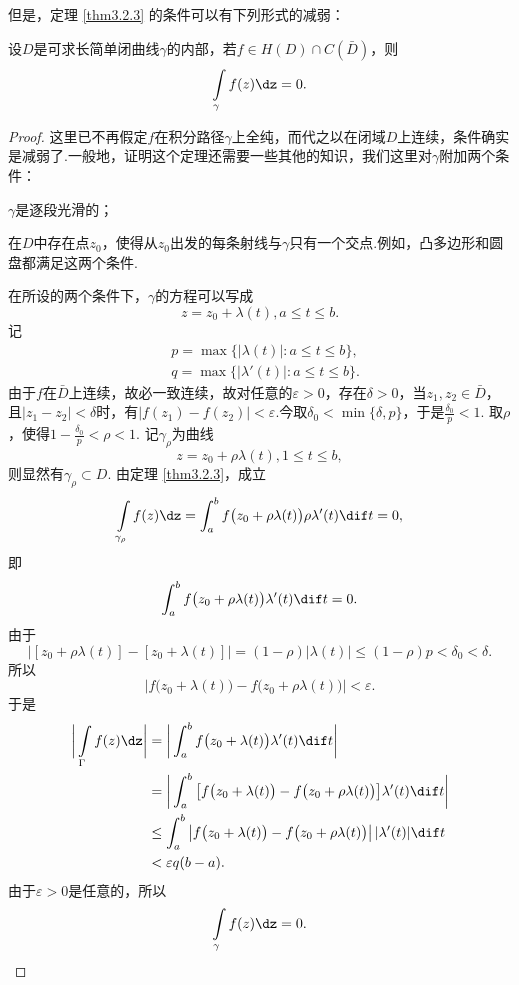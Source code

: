 但是，定理 \ref{thm3.2.3} 的条件可以有下列形式的减弱：
\begin{theorem}\label{thm3.2.4}
设$D$是可求长简单闭曲线$\gamma$的内部，若$f\in H(D)\cap C(\bar D)$，则
\[\int\limits_\gamma f(z)\dz=0.\]
\end{theorem}
\begin{proof}
这里已不再假定$f$在积分路径$\gamma$上全纯，而代之以在闭域$D$上连续，条件确实是减弱了.一般地，证明这个定理还需要一些其他的知识，我们这里对$\gamma$附加两个条件：
\begin{eenum}
\item $\gamma$是逐段光滑的；
\item 在$D$中存在点$z_0$，使得从$z_0$出发的每条射线与$\gamma$只有一个交点.例如，凸多边形和圆盘都满足这两个条件.
\end{eenum}

在所设的两个条件下，$\gamma$的方程可以写成
\[z=z_0+\lambda(t),a\le t\le b.\]
记
\begin{align*}
&p=\max\{|\lambda(t)|:a\le t\le b\},\\
&q=\max\{|\lambda'(t)|:a\le t\le b\}.
\end{align*}
由于$f$在$\bar D$上连续，故必一致连续，故对任意的$\varepsilon>0$，存在$\delta>0$，当$z_1,z_2\in\bar D$，且$|z_1-z_2|<\delta$时，有$|f(z_1)-f(z_2)|<\varepsilon$.今取$\delta_0<\min\{\delta,p\}$，于是$\frac{\delta_0}p<1$. 取$\rho$，使得$1-\frac{\delta_0}p<\rho<1$. 记$\gamma_\rho$为曲线
\[z=z_0+\rho\lambda(t),1\le t\le b,\]
则显然有$\gamma_\rho\subset D$. 由定理 \ref{thm3.2.3}，成立
\[\int\limits_{\gamma_\rho}f(z)\dz=\int_a^bf\big(z_0+\rho\lambda(t)\big)
\rho\lambda'(t)\dif t=0,\]
即
\[\int_a^bf\big(z_0+\rho\lambda(t)\big)\lambda'(t)\dif t=0.\]
由于
\[\big|[z_0+\rho\lambda(t)]-[z_0+\lambda(t)]\big|
  = (1-\rho)|\lambda(t)|\le(1-\rho)p<\delta_0<\delta.\]
所以
\[\big|f\big(z_0+\lambda(t)\big)-f\big(z_0+\rho\lambda(t)\big)\big|<\varepsilon.\]
于是
\begin{align*}
\bigg|\int\limits_\Gamma f(z)\dz\bigg|
& = \bigg|\int_a^bf\big(z_0+\lambda(t)\big)\lambda'(t)\dif t\bigg| \\
& = \bigg|\int_a^b\big[f\big(z_0+\lambda(t)\big)-f\big(z_0+\rho\lambda(t)\big)\big]
    \lambda'(t)\dif t\bigg| \\
& \le \int_a^b\big|f\big(z_0+\lambda(t)\big)-f\big(z_0+
\rho\lambda(t)\big)\big|\,|\lambda'(t)|\dif t \\
& < \varepsilon q(b-a).
\end{align*}
由于$\varepsilon>0$是任意的，所以
\begin{equation*}
\int\limits_\gamma f(z)\dz=0.
\end{equation*}
\end{proof}

